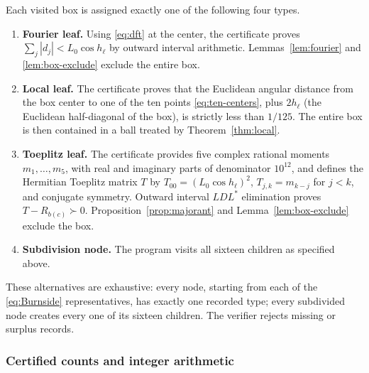 \documentclass[11pt]{article}
\begin{document}
Each visited box is assigned exactly one of the following four types.
\begin{enumerate}[label=\textbf{\arabic*.},leftmargin=*]
\item \textbf{Fourier leaf.} Using \eqref{eq:dft} at the center, the certificate proves
$\sum_j|d_j|<L_0\cos h_\ell$ by outward interval arithmetic. Lemmas~\ref{lem:fourier} and \ref{lem:box-exclude} exclude the entire box.
\item \textbf{Local leaf.} The certificate proves that the Euclidean angular distance from the box center to one of the ten points \eqref{eq:ten-centers}, plus $2h_\ell$ (the Euclidean half-diagonal of the box), is strictly less than $1/125$. The entire box is then contained in a ball treated by Theorem~\ref{thm:local}.
\item \textbf{Toeplitz leaf.} The certificate provides five complex rational moments $m_1,\ldots,m_5$, with real and imaginary parts of denominator $10^{12}$, and defines the Hermitian Toeplitz matrix $T$ by $T_{00}=(L_0\cos h_\ell)^2$, $T_{j,k}=m_{k-j}$ for $j<k$, and conjugate symmetry. Outward interval $LDL^*$ elimination proves $T-R_{b(c)}\succ0$. Proposition~\ref{prop:majorant} and Lemma~\ref{lem:box-exclude} exclude the box.
\item \textbf{Subdivision node.} The program visits all sixteen children as specified above.
\end{enumerate}

These alternatives are exhaustive: every node, starting from each of the \eqref{eq:Burnside} representatives, has exactly one recorded type; every subdivided node creates every one of its sixteen children. The verifier rejects missing or surplus records.

\subsubsection{Certified counts and integer arithmetic}
\end{document}
